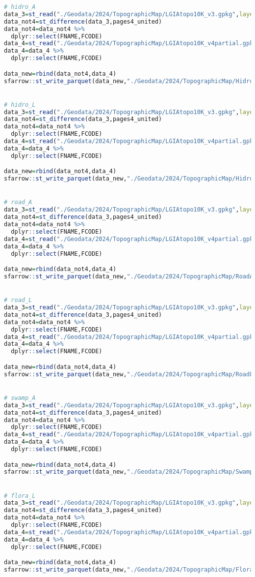 \documentclass[
]{book}
\begin{document}
\begin{lstlisting}[language=R]
# hidro_A
data_3=st_read("./Geodata/2024/TopographicMap/LGIAtopo10K_v3.gpkg",layer="hidro_A")
data_not4=st_difference(data_3,pages4_united)
data_not4=data_not4 %>% 
  dplyr::select(FNAME,FCODE)
data_4=st_read("./Geodata/2024/TopographicMap/LGIAtopo10K_v4partial.gpkg",layer="hidro_A")
data_4=data_4 %>% 
  dplyr::select(FNAME,FCODE)

data_new=rbind(data_not4,data_4)
sfarrow::st_write_parquet(data_new,"./Geodata/2024/TopographicMap/HidroA_COMB.parquet")


# hidro_L
data_3=st_read("./Geodata/2024/TopographicMap/LGIAtopo10K_v3.gpkg",layer="hidro_L")
data_not4=st_difference(data_3,pages4_united)
data_not4=data_not4 %>% 
  dplyr::select(FNAME,FCODE)
data_4=st_read("./Geodata/2024/TopographicMap/LGIAtopo10K_v4partial.gpkg",layer="hidro_L")
data_4=data_4 %>% 
  dplyr::select(FNAME,FCODE)

data_new=rbind(data_not4,data_4)
sfarrow::st_write_parquet(data_new,"./Geodata/2024/TopographicMap/HidroL_COMB.parquet")


# road_A
data_3=st_read("./Geodata/2024/TopographicMap/LGIAtopo10K_v3.gpkg",layer="road_A")
data_not4=st_difference(data_3,pages4_united)
data_not4=data_not4 %>% 
  dplyr::select(FNAME,FCODE)
data_4=st_read("./Geodata/2024/TopographicMap/LGIAtopo10K_v4partial.gpkg",layer="road_A")
data_4=data_4 %>% 
  dplyr::select(FNAME,FCODE)

data_new=rbind(data_not4,data_4)
sfarrow::st_write_parquet(data_new,"./Geodata/2024/TopographicMap/RoadA_COMB.parquet")


# road_L
data_3=st_read("./Geodata/2024/TopographicMap/LGIAtopo10K_v3.gpkg",layer="road_L")
data_not4=st_difference(data_3,pages4_united)
data_not4=data_not4 %>% 
  dplyr::select(FNAME,FCODE)
data_4=st_read("./Geodata/2024/TopographicMap/LGIAtopo10K_v4partial.gpkg",layer="road_L")
data_4=data_4 %>% 
  dplyr::select(FNAME,FCODE)

data_new=rbind(data_not4,data_4)
sfarrow::st_write_parquet(data_new,"./Geodata/2024/TopographicMap/RoadL_COMB.parquet")


# swamp_A
data_3=st_read("./Geodata/2024/TopographicMap/LGIAtopo10K_v3.gpkg",layer="swamp_A")
data_not4=st_difference(data_3,pages4_united)
data_not4=data_not4 %>% 
  dplyr::select(FNAME,FCODE)
data_4=st_read("./Geodata/2024/TopographicMap/LGIAtopo10K_v4partial.gpkg",layer="swamp_A")
data_4=data_4 %>% 
  dplyr::select(FNAME,FCODE)

data_new=rbind(data_not4,data_4)
sfarrow::st_write_parquet(data_new,"./Geodata/2024/TopographicMap/SwampA_COMB.parquet")


# flora_L
data_3=st_read("./Geodata/2024/TopographicMap/LGIAtopo10K_v3.gpkg",layer="flora_L")
data_not4=st_difference(data_3,pages4_united)
data_not4=data_not4 %>% 
  dplyr::select(FNAME,FCODE)
data_4=st_read("./Geodata/2024/TopographicMap/LGIAtopo10K_v4partial.gpkg",layer="flora_L")
data_4=data_4 %>% 
  dplyr::select(FNAME,FCODE)

data_new=rbind(data_not4,data_4)
sfarrow::st_write_parquet(data_new,"./Geodata/2024/TopographicMap/FloraL_COMB.parquet")
\end{lstlisting}
\end{document}

